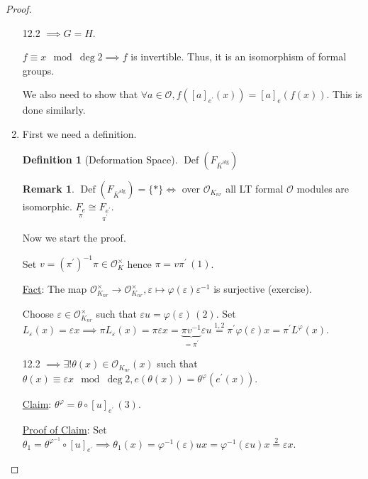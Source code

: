 \documentclass[openany]{amsbook}
\numberwithin{section}{chapter}
\theoremstyle{definition}
\newtheorem*{definition}{Definition}
\newtheorem*{remark}{Remark}
\begin{document}
\begin{proof}
\begin{enumerate}[label=\roman*)]
        12.2 \(\implies G = H\).

        \(f \equiv x \mod\deg 2 \implies f\) is invertible. Thus, it is an isomorphism of formal groups.

        We also need to show that \(\forall a\in \mathcal{O}, f([a]_{e^{\prime}}(x))=[a]_e(f(x))\). This is done similarly.

        \item First we need a definition.
        
        \begin{definition}
            [Deformation Space] \(\operatorname{Def} \left( F_{\overline{K}^{\operatorname{alg}}} \right)\) 
        \end{definition}

        \begin{remark}
            \(\operatorname{Def}(F_{\overline{K}^{\operatorname{alg}}})= \{\ast\} \iff\) over \(\mathcal{O}_{K_{nr}}\) all LT formal \(\mathcal{O}\) modules are isomorphic. \(\underset{\pi}{F_e} \cong \underset{\pi^{\prime}}{F_{e^{\prime}}}\).
        \end{remark}

        Now we start the proof.

        Set \(v = (\pi^{\prime})^{-1} \pi \in \mathcal{O}_K^\times\) hence \(\boxed{\pi = v \pi ^{\prime}} \, (1)\).

        \underline{Fact}: The map \(\mathcal{O}_{K_{nr}}^\times \to \mathcal{O}_{K_{nr}}^\times , \varepsilon \mapsto \varphi (\varepsilon) \varepsilon ^{-1} \) is surjective (exercise).
        
        Choose \(\varepsilon \in \mathcal{O}_{K_{nr}}^\times\) such that \(\boxed{\varepsilon u = \varphi (\varepsilon)} \, (2)\). Set \(L_{\varepsilon} (x) = \varepsilon x \implies \pi L_{\varepsilon}(x) = \pi \varepsilon x = \underbrace{\pi v ^{-1}}_{= \pi ^{\prime} } \varepsilon u \overset{1,2}{=} \pi ^{\prime} \varphi (\varepsilon) x = \pi ^{\prime} L^{\varphi }(x)  \).
        
        12.2 \(\implies \exists ! \theta (x) \in \mathcal{O}_{K_{nr}}(x)\) such that \(\theta (x) \equiv \varepsilon x \mod\deg 2, e(\theta (x))= \theta ^\varphi (e^{\prime} (x))\). 

        \underline{Claim}: \(\theta^{\varphi} = \theta \circ [u]_{e^{\prime}}  \, (3)\).
        
        \underline{Proof of Claim}: Set \(\theta_1 = \theta^{\varphi ^{-1}} \circ [u]_{e^{\prime}} \implies \theta_1(x) = \varphi ^{-1} (\varepsilon) u x = \varphi ^{-1} (\varepsilon u) x \overset{2}{=} \varepsilon x\).


\end{enumerate}
\end{proof}
\end{document}
